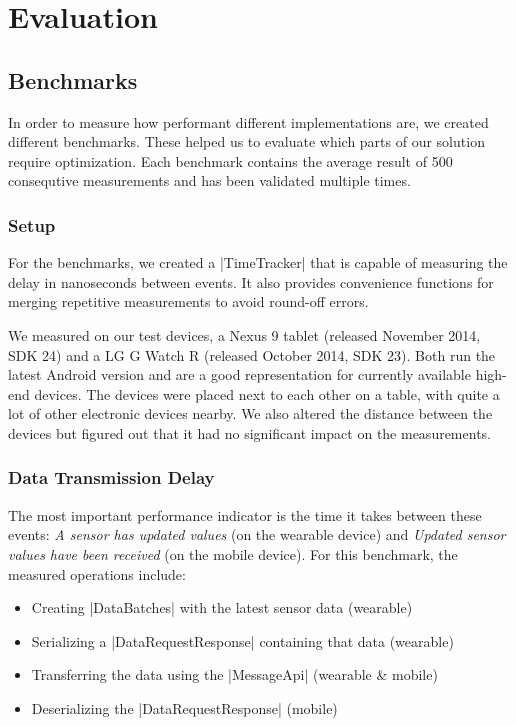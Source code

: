 \section{Evaluation}
\label{sec:evaluation}

\subsection{Benchmarks}
\label{sec:evaluation:benchmarks}
In order to measure how performant different implementations are, we created different benchmarks.
These helped us to evaluate which parts of our solution require optimization.
Each benchmark contains the average result of 500 consequtive measurements and has been validated multiple times.

\subsubsection{Setup}
For the benchmarks, we created a |TimeTracker|\cite{sensordatalogger:timetracker} that is capable of measuring the delay in nanoseconds between events. It also provides convenience functions for merging repetitive measurements to avoid round-off errors.

We measured on our test devices, a Nexus 9 tablet (released November 2014, SDK 24) and a LG G Watch R (released October 2014, SDK 23). Both run the latest Android version and are a good representation for currently available high-end devices.
The devices were placed next to each other on a table, with quite a lot of other electronic devices nearby.
We also altered the distance between the devices but figured out that it had no significant impact on the measurements.

\subsubsection{Data Transmission Delay}
The most important performance indicator is the time it takes between these events: \textit{A sensor has updated values} (on the wearable device) and \textit{Updated sensor values have been received} (on the mobile device). For this benchmark, the measured operations include:

\begin{itemize}[noitemsep]
	\item Creating |DataBatches|\cite{sensordatalogger:databatch} with the latest sensor data (wearable)
	\item Serializing a |DataRequestResponse|\cite{sensordatalogger:datarequestresponse} containing that data (wearable)
	\item Transferring the data using the |MessageApi|\cite{androiddocs:messageapi} (wearable \& mobile)
	\item Deserializing the |DataRequestResponse| (mobile)
\end{itemize}

